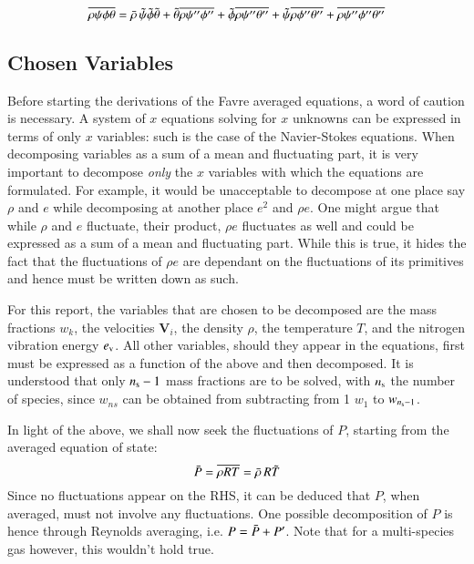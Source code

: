 \documentclass{warpdoc}
\newcommand{\ns}{{{n}_{\rm s}}}
\newcommand{\mfd}{\displaystyle}
\newcommand{\ev}{e_{\rm v}}
\begin{document}
%
\begin{displaymath}
   \mfd\overline{\rho \psi \phi \theta} = \mfd\wbar{\rho}\, {\wtilde{\psi}} {\wtilde{\phi}} \wtilde{\theta}
       +\wtilde{\theta} \overline{\rho \psi^{\prime\prime} \phi^{\prime\prime}}
       +{\wtilde{\phi}} \overline{\rho \psi^{\prime\prime} \theta^{\prime\prime}}
       +{\wtilde{\psi}} \overline{\rho \phi^{\prime\prime} \theta^{\prime\prime}}
       +\overline{\rho \psi^{\prime\prime} \phi^{\prime\prime} \theta^{\prime\prime}}
\end{displaymath}
%



\subsection{Chosen Variables}

Before starting the derivations of the Favre averaged
equations, a word of caution is necessary. A system of
$x$ equations solving for $x$ unknowns
can be expressed in terms of only $x$ variables: such
is the case of the Navier-Stokes equations.
When decomposing variables as a sum of a mean
and fluctuating part, it is very important to decompose
\emph{only} the $x$ variables with which the equations
are formulated. For example, it would be unacceptable to decompose
at one place say $\rho$ and $e$ while decomposing at
another place $e^2$ and $\rho e$. One might argue that
while $\rho$ and $e$ fluctuate, their product, $\rho e$
fluctuates as well and could be expressed as a sum of a mean
and fluctuating part. While this is true, it hides the fact that
the fluctuations of $\rho e$ are dependant on the fluctuations
of its primitives and hence must be written down as such.

For this report, the variables that are chosen to
be decomposed are the mass fractions $w_k$, the velocities
$\bm{V}_i$, the density $\rho$, the temperature $T$, and the nitrogen vibration energy $\ev$.
All other variables, should they appear in the equations,
first must be expressed as a function of the above and then decomposed.
It is understood that only $\ns-1$ mass fractions are to be solved,
with $\ns$ the number of species, since $w_{ns}$ can be obtained
from subtracting from 1 $w_1$ to $w_{\ns-1}$.

In light of the above, we shall now seek the fluctuations of $P$,
starting from the averaged equation of state:
%
\begin{equation}
  \bar{P}=\overline{\rho R T}=\bar{\rho}\, R \tilde{T}
\end{equation}
%
Since no fluctuations appear on the RHS, it can be deduced
that $P$, when averaged, must not involve any fluctuations.
One possible decomposition of $P$ is hence through Reynolds
averaging, i.e. $P=\bar{P}+P^{\prime}$. Note that for a multi-species
gas however, this wouldn't hold true.
\end{document}

